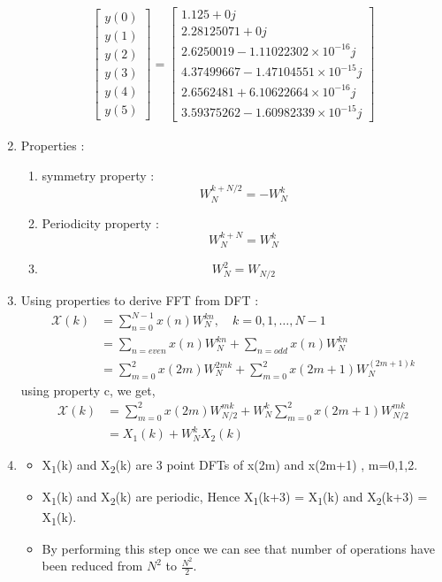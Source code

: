 \documentclass[journal,12pt,twocolumn]{IEEEtran}
\renewcommand\thesection{\arabic{section}}
\begin{document}
\begin{enumerate}[label=\thesection.\arabic*.,ref=\thesection.\theenumi]
\begin{align}
    \begin{bmatrix} 
y(0) \\ y(1) \\ y(2) \\ y(3) \\ y(4) \\ y(5) 
\end{bmatrix}
=
\begin{bmatrix}
1.125     +0j \\ 2.28125071+0j \\ 2.6250019 -1.11022302 \times 10^{-16}j \\ 4.37499667-1.47104551\times 10^{-15}j \\ 2.6562481 +6.10622664 \times 10^{-16}j \\ 3.59375262-1.60982339 \times 10^{-15}j 
\end{bmatrix}
\end{align}

\item
Properties :
\begin{enumerate}
    \item symmetry property : \[ W^{k+N/2}_{N} = - W^{k}_{N} \] 
    \label{p:p1}
    \item Periodicity property :  \[ W^{k+N}_{N} =  W^{k}_{N} \]     
    \label{p:p2}
    \item \[ W^{2}_{N} =  W_{N/2} \] 
    \label{p:p3}
\end{enumerate}
\item 
Using properties to derive FFT from DFT :
    \begin{align}
       \mathcal X(k) &=  \sum_{n=0}^{N-1} x(n)W^{kn}_{N}, \quad k=0,1, \ldots, N-1 \\
       &= \sum_{n=even} x(n)W^{kn}_{N} + \sum_{n=odd} x(n)W^{kn}_{N} \\
       &= \sum_{m=0}^{2} x(2m)W^{2mk}_{N} + \sum_{m=0}^{2} x(2m+1)W^{(2m+1)k}_{N} 
    \end{align}
using property c, we get,
    \begin{align}
        \mathcal X(k) &= \sum_{m=0}^{2} x(2m)W^{mk}_{N/2} + W^{k}_{N} \sum_{m=0}^{2} x(2m+1)W^{mk}_{N/2} \\
        &= X_{1}(k) + W^{k}_{N}X_{2}(k)
    \end{align}

\item
\begin{itemize}
    \item X\textsubscript{1}(k) and X\textsubscript{2}(k) are 3 point DFTs of x(2m) and x(2m+1) , m=0,1,2.
    \item X\textsubscript{1}(k) and X\textsubscript{2}(k) are periodic, Hence X\textsubscript{1}(k+3) = X\textsubscript{1}(k) and X\textsubscript{2}(k+3) = X\textsubscript{1}(k).
    \item By performing this step once we can see that number of operations have been reduced
    from $N^2$ to $\frac{N^2}{2}$.
\end{itemize}


\end{enumerate}
\end{document}
